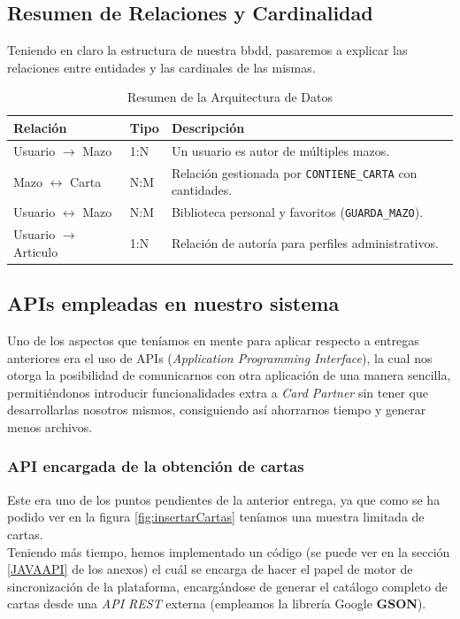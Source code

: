 \documentclass[10pt]{article}
\begin{document}
	\subsection{Resumen de Relaciones y Cardinalidad}
	Teniendo en claro la estructura de nuestra bbdd, pasaremos a explicar las relaciones entre entidades y las cardinales de las mismas.
	\begin{table}[H]
		\centering
		\begin{tabularx}{\textwidth}{l l X}
			\toprule
			\textbf{Relación} & \textbf{Tipo} & \textbf{Descripción} \\
			\midrule
			Usuario $\rightarrow$ Mazo & 1:N & Un usuario es autor de múltiples mazos. \\
			Mazo $\leftrightarrow$ Carta & N:M & Relación gestionada por \texttt{CONTIENE\_CARTA} con cantidades. \\
			Usuario $\leftrightarrow$ Mazo & N:M & Biblioteca personal y favoritos (\texttt{GUARDA\_MAZO}). \\
			Usuario $\rightarrow$ Articulo & 1:N & Relación de autoría para perfiles administrativos. \\
			\bottomrule
		\end{tabularx}
		\caption{Resumen de la Arquitectura de Datos} 
	\end{table}
	
	\subsection{APIs empleadas en nuestro sistema}
		Uno de los aspectos que teníamos en mente para aplicar respecto a entregas anteriores era el uso de APIs (\textit{Application Programming Interface}), la cual nos otorga la posibilidad de comunicarnos con otra aplicación de una manera sencilla, permitiéndonos introducir funcionalidades extra a \textit{Card Partner} sin tener que desarrollarlas nosotros mismos, consiguiendo así ahorrarnos tiempo y generar menos archivos.
	
	\subsubsection{API encargada de la obtención de cartas}
		Este era uno de los puntos pendientes de la anterior entrega, ya que como se ha podido ver en la figura \ref{fig:insertarCartas} teníamos una muestra limitada de cartas.\\
		Teniendo más tiempo, hemos implementado un código (se puede ver en la sección \ref{JAVAAPI} de los anexos) el cuál se encarga de hacer el papel de motor de sincronización de la plataforma, encargándose de generar el catálogo completo de cartas desde una \textit{API REST} externa (empleamos la librería Google \textbf{GSON}).\\
		
\end{document}
